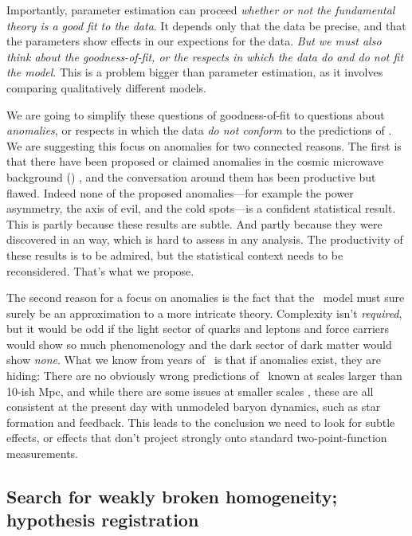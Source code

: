 \documentclass[12pt, fullpage, letterpaper]{article}
\begin{document}
Importantly,
parameter estimation can proceed \emph{whether or not the fundamental theory
is a good fit to the data}.
It depends only that the data be precise, and that the parameters show
effects in our expections for the data.
\emph{But we must also think about the goodness-of-fit,
or the respects in which the data do and do not fit the model}.
This is a problem bigger than parameter estimation, as it involves comparing qualitatively different models.

We are going to simplify these questions of goodness-of-fit to questions about
\emph{anomalies}, or respects in which the data \emph{do not conform}
to the predictions of \LCDM.
We are suggesting this focus on anomalies for two connected reasons.
The first is that there have been proposed or claimed anomalies in the
cosmic microwave background (\CMB) \citep{Huterer2010}, and the conversation around them has been
productive but flawed.
Indeed none of the proposed anomalies---for example the power
asymmetry, the axis of evil, and the cold
spots---is a confident statistical result.
This is partly because these results are subtle.
And partly because they were discovered in an  way, which is hard to
assess in any  analysis.
The productivity of these results is to be admired, but the statistical
context needs to be reconsidered.
That's what we propose.

The second reason for a focus on anomalies is the fact that the \LCDM\ model must sure surely be an approximation to a more intricate theory.
Complexity isn't \emph{required}, but it would be odd if the light sector of quarks and leptons and
force carriers would show so much phenomenology and the dark sector of
dark matter would show \emph{none}.
What we know from years of \LCDM\ is that if anomalies exist, they are
hiding: There are no obviously wrong predictions of \LCDM\ known at
scales larger than 10-ish Mpc, and while there are some issues at smaller scales \citep{Bullock2017}, these are
all consistent at the present day with unmodeled baryon dynamics, such as star formation and feedback.
This leads to the conclusion we need to look for subtle effects, or effects that
don't project strongly onto standard two-point-function measurements.

\subsection{Search for weakly broken homogeneity; hypothesis registration}
\end{document}
